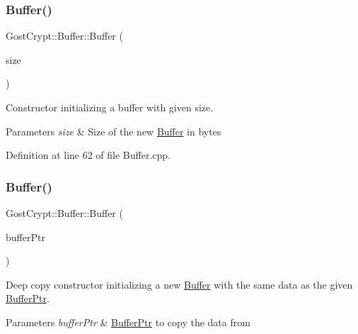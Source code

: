 \subsubsection{\texorpdfstring{Buffer()}{Buffer()}\hspace{0.1cm}{\footnotesize\ttfamily [2/3]}}
{\footnotesize\ttfamily Gost\+Crypt\+::\+Buffer\+::\+Buffer (\begin{DoxyParamCaption}\item[{size\+\_\+t}]{size }\end{DoxyParamCaption})}



Constructor initializing a buffer with given size. 


\begin{DoxyParams}{Parameters}
{\em size} & Size of the new \hyperlink{class_gost_crypt_1_1_buffer}{Buffer} in bytes \\
\hline
\end{DoxyParams}


Definition at line 62 of file Buffer.\+cpp.

\mbox{\label{class_gost_crypt_1_1_buffer_a079e8e1baffbf5912dbc161b7b58538c}} 
\subsubsection{\texorpdfstring{Buffer()}{Buffer()}\hspace{0.1cm}{\footnotesize\ttfamily [3/3]}}
{\footnotesize\ttfamily Gost\+Crypt\+::\+Buffer\+::\+Buffer (\begin{DoxyParamCaption}\item[{const \hyperlink{class_gost_crypt_1_1_buffer_ptr}{Buffer\+Ptr} \&}]{buffer\+Ptr }\end{DoxyParamCaption})\hspace{0.3cm}{\ttfamily [inline]}}



Deep copy constructor initializing a new \hyperlink{class_gost_crypt_1_1_buffer}{Buffer} with the same data as the given \hyperlink{class_gost_crypt_1_1_buffer_ptr}{Buffer\+Ptr}. 


\begin{DoxyParams}{Parameters}
{\em buffer\+Ptr} & \hyperlink{class_gost_crypt_1_1_buffer_ptr}{Buffer\+Ptr} to copy the data from \\
\hline
\end{DoxyParams}


